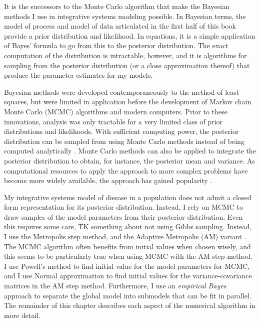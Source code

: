 It is the successors to the Monte Carlo algorithm that make the
Bayesian methods I use in integrative systems modeling possible.  In
Bayesian terms, the model of process and model of data articulated in
the first half of this book provide a prior distribution and
likelihood.  In equations, it is a simple application of Bayes'
formula to go from this to the posterior distribution.  The exact
computation of the distribution is intractable, however, and it is
algorithms for sampling from the posterior distribution (or a close
approximation thereof) that produce the parameter estimates for my
models.

Bayesian methods were developed contemporaneously to the method of
least squares, but were limited in application before the development
of Markov chain Monte Carlo (MCMC) algorithms and modern computers.
Prior to these innovations, analysis was only tractable for a very
limited class of prior distributions and likelihoods. With sufficient
computing power, the posterior distribution can be sampled from using
Monte Carlo methods instead of being computed analytically
\cite{Gelman_Bayesian_2003}. Monte Carlo methods can also be applied
to integrate the posterior distribution to obtain, for instance, the
posterior mean and variance. As computational resources to apply the
approach to more complex problems have become more widely available,
the approach has gained popularity \cite{Tanner_From_2010}.

My integrative systems model of disease in a population does not admit
a closed form representation for its posterior distribution.  Instead,
I rely on MCMC to draw samples of the model parameters from their
posterior distribution.  Even this requires some care, TK something
about not using Gibbs sampling.  Instead, I use the Metropolis step
method, and the Adaptive Metropolis (AM) variant
\cite{Haario_Adaptive_2001}. The MCMC algorithm often benefits from
initial values when chosen wisely, and this seems to be particularly
true when using MCMC with the AM step method. I use Powell's method
to find initial value for the model parameters for MCMC, and I use
Normal approximation to find initial values for the
variance-covariance matrices in the AM step method.  Furthermore, I
use an \emph{empirical Bayes} approach to separate the global model
into submodels that can be fit in parallel.  The remainder of this
chapter describes each aspect of the numerical algorithm in more
detail.

